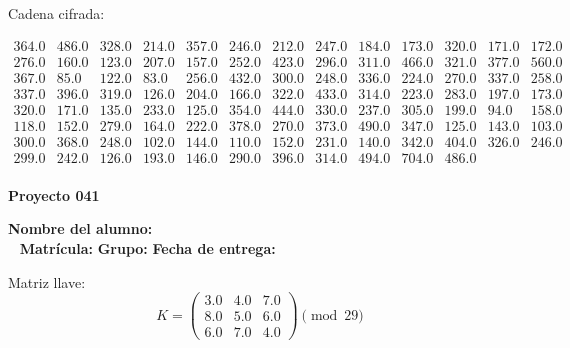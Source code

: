 \documentclass[12pt]{article}
\begin{document}
Cadena cifrada:
\begin{center}
$\begin{array}{lllllllllllll}
364.0 & 486.0 & 328.0 & 214.0 & 357.0 & 246.0 & 212.0 & 247.0 & 184.0 & 173.0 & 320.0 & 171.0 & 172.0\\
276.0 & 160.0 & 123.0 & 207.0 & 157.0 & 252.0 & 423.0 & 296.0 & 311.0 & 466.0 & 321.0 & 377.0 & 560.0\\
367.0 & 85.0 & 122.0 & 83.0 & 256.0 & 432.0 & 300.0 & 248.0 & 336.0 & 224.0 & 270.0 & 337.0 & 258.0\\
337.0 & 396.0 & 319.0 & 126.0 & 204.0 & 166.0 & 322.0 & 433.0 & 314.0 & 223.0 & 283.0 & 197.0 & 173.0\\
320.0 & 171.0 & 135.0 & 233.0 & 125.0 & 354.0 & 444.0 & 330.0 & 237.0 & 305.0 & 199.0 & 94.0 & 158.0\\
118.0 & 152.0 & 279.0 & 164.0 & 222.0 & 378.0 & 270.0 & 373.0 & 490.0 & 347.0 & 125.0 & 143.0 & 103.0\\
300.0 & 368.0 & 248.0 & 102.0 & 144.0 & 110.0 & 152.0 & 231.0 & 140.0 & 342.0 & 404.0 & 326.0 & 246.0\\
299.0 & 242.0 & 126.0 & 193.0 & 146.0 & 290.0 & 396.0 & 314.0 & 494.0 & 704.0 & 486.0\\
\end{array}$
\end{center}

\newpage


\textbf{Proyecto 041}

\textbf{Nombre del alumno:} \underline{\hspace{13cm}}\\\
\vspace{1cm}
\textbf{Matrícula:} \underline{\hspace{4cm}} \hspace{1cm}
\textbf{Grupo:} \underline{\hspace{2cm}}
\textbf{Fecha de entrega:} \underline{\hspace{2cm}}

\medskip

Matriz llave:
\[
K = \begin{pmatrix}
3.0 & 4.0 & 7.0\\
8.0 & 5.0 & 6.0\\
6.0 & 7.0 & 4.0
\end{pmatrix} \pmod{29}
\]
\end{document}
